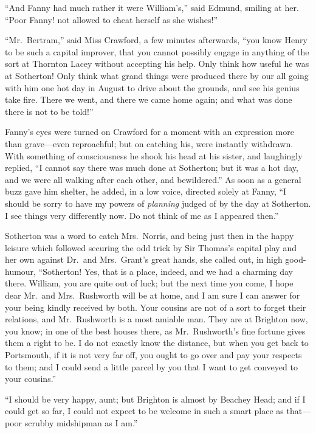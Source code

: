 ``And Fanny had much rather it were William's,'' said Edmund,
smiling at her.  ``Poor Fanny! not allowed to cheat herself
as she wishes!''

``Mr.\ Bertram,'' said Miss Crawford, a few minutes afterwards,
``you know Henry to be such a capital improver, that you
cannot possibly engage in anything of the sort at Thornton
Lacey without accepting his help.  Only think how useful
he was at Sotherton!  Only think what grand things were
produced there by our all going with him one hot day
in August to drive about the grounds, and see his genius
take fire.  There we went, and there we came home again;
and what was done there is not to be told!''

Fanny's eyes were turned on Crawford for a moment
with an expression more than grave---even reproachful;
but on catching his, were instantly withdrawn.
With something of consciousness he shook his head at
his sister, and laughingly replied, ``I cannot say there
was much done at Sotherton; but it was a hot day, and we
were all walking after each other, and bewildered.''
As soon as a general buzz gave him shelter, he added,
in a low voice, directed solely at Fanny, ``I should be
sorry to have my powers of \emph{planning} judged of by the
day at Sotherton.  I see things very differently now.
Do not think of me as I appeared then.''

Sotherton was a word to catch Mrs.\ Norris, and being
just then in the happy leisure which followed securing
the odd trick by Sir Thomas's capital play and her own
against Dr.\ and Mrs.\ Grant's great hands, she called out,
in high good-humour, ``Sotherton!  Yes, that is a place,
indeed, and we had a charming day there.  William, you are
quite out of luck; but the next time you come, I hope dear
Mr.\ and Mrs.\ Rushworth will be at home, and I am sure
I can answer for your being kindly received by both.
Your cousins are not of a sort to forget their relations,
and Mr.\ Rushworth is a most amiable man.  They are at
Brighton now, you know; in one of the best houses there,
as Mr.\ Rushworth's fine fortune gives them a right to be.
I do not exactly know the distance, but when you get back
to Portsmouth, if it is not very far off, you ought to go
over and pay your respects to them; and I could send
a little parcel by you that I want to get conveyed to
your cousins.''

``I should be very happy, aunt; but Brighton is almost
by Beachey Head; and if I could get so far, I could
not expect to be welcome in such a smart place as that---%
poor scrubby midshipman as I am.''

